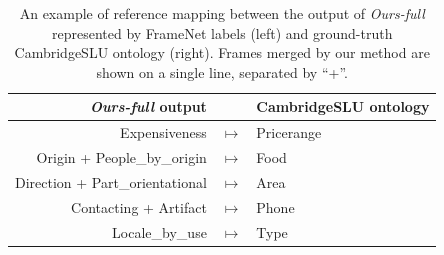 \begin{table}[h!]
    \centering
    \small
    \begin{tabular}{rcl}
    \textbf{\emph{Ours-full} output} & & \textbf{CambridgeSLU ontology}\\\hline
     Expensiveness & $ \mapsto$ & Pricerange\\
     Origin + People\_by\_origin & $ \mapsto$ & Food\\
     Direction + Part\_orientational & $ \mapsto$ & Area\\
     Contacting + Artifact & $ \mapsto$ & Phone\\
     Locale\_by\_use & $ \mapsto$ & Type \\
     

    \end{tabular}
    \caption{An example of reference mapping between the output of \emph{Ours-full} represented by FrameNet labels (left) and ground-truth CambridgeSLU ontology (right).
    Frames merged by our method are shown on a single line, separated by “+”.
    }
    \label{03:ref_mapping}
\end{table}

